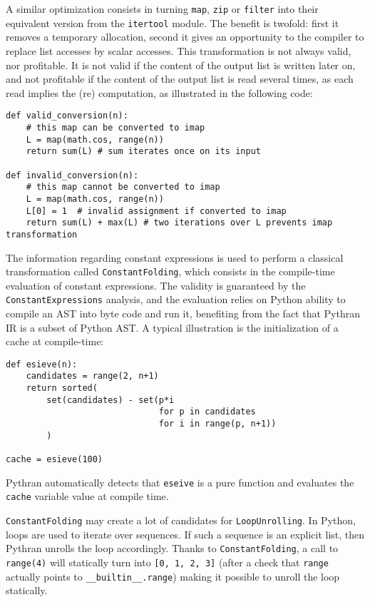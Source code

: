 \documentclass[10pt, onecolumn, preprint]{sigplanconf}
\begin{document}
A similar optimization consists in turning \texttt{map}, \texttt{zip} or
\texttt{filter} into their equivalent version from the \texttt{itertool}
module. The benefit is twofold: first it removes a temporary allocation, second
it gives an opportunity to the compiler to replace list accesses by scalar
accesses. This transformation is not always valid, nor profitable. It is not
valid if the content of the output list is written later on, and not profitable
if the content of the output list is read several times, as each read implies
the (re) computation, as illustrated in the following code:

\begin{lstlisting}
def valid_conversion(n):
    # this map can be converted to imap
    L = map(math.cos, range(n))
    return sum(L) # sum iterates once on its input

def invalid_conversion(n):
    # this map cannot be converted to imap
    L = map(math.cos, range(n))
    L[0] = 1  # invalid assignment if converted to imap
    return sum(L) + max(L) # two iterations over L prevents imap transformation
\end{lstlisting}

The information regarding constant expressions is used to perform a classical
transformation called \texttt{ConstantFolding}, which consists in the compile-time
evaluation of constant expressions. The validity is guaranteed by the
\texttt{ConstantExpressions} analysis, and the evaluation relies on Python ability to
compile an AST into byte code and run it, benefiting from the fact that Pythran
IR is a subset of Python AST. A typical illustration is the initialization of a
cache at compile-time:

\begin{lstlisting}
def esieve(n):
    candidates = range(2, n+1)
    return sorted(
        set(candidates) - set(p*i
                              for p in candidates
                              for i in range(p, n+1))
        )

cache = esieve(100)
\end{lstlisting}

Pythran automatically detects that \texttt{eseive} is a pure function and evaluates
the \texttt{cache} variable value at compile time.

\texttt{ConstantFolding} may create a lot of candidates for 
\texttt{LoopUnrolling}. In Python, loops are used to iterate over sequences. If
such a sequence is an explicit list, then Pythran unrolls the loop accordingly.
Thanks to \texttt{ConstantFolding}, a call to \texttt{range(4)} will statically
turn into \texttt{[0, 1, 2, 3]} (after a check that \texttt{range} actually
points to \texttt{\_\_builtin\_\_.range}) making it possible to unroll the loop
statically.
\end{document}
